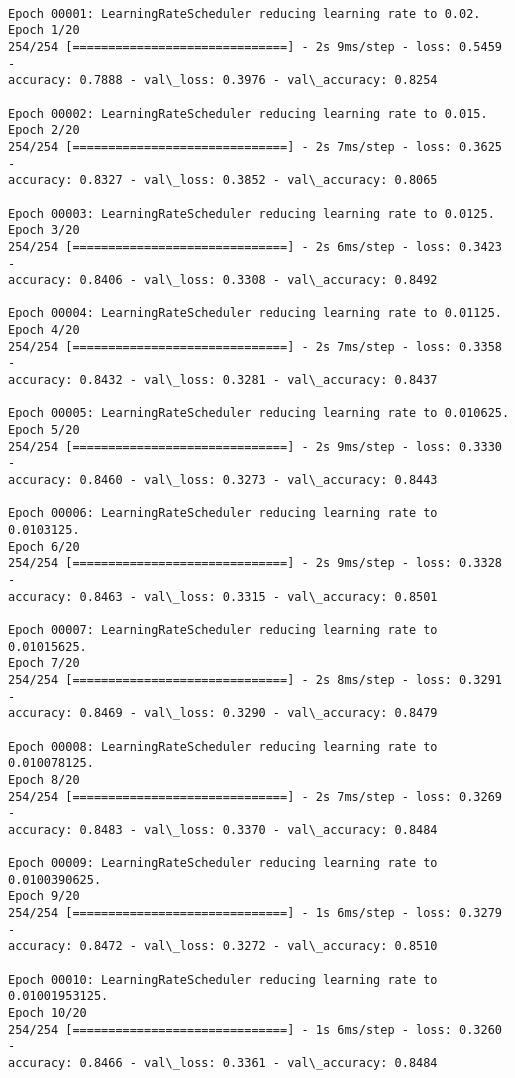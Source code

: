 \documentclass[11pt]{article}
\begin{document}
    \begin{Verbatim}[commandchars=\\\{\}]

Epoch 00001: LearningRateScheduler reducing learning rate to 0.02.
Epoch 1/20
254/254 [==============================] - 2s 9ms/step - loss: 0.5459 -
accuracy: 0.7888 - val\_loss: 0.3976 - val\_accuracy: 0.8254

Epoch 00002: LearningRateScheduler reducing learning rate to 0.015.
Epoch 2/20
254/254 [==============================] - 2s 7ms/step - loss: 0.3625 -
accuracy: 0.8327 - val\_loss: 0.3852 - val\_accuracy: 0.8065

Epoch 00003: LearningRateScheduler reducing learning rate to 0.0125.
Epoch 3/20
254/254 [==============================] - 2s 6ms/step - loss: 0.3423 -
accuracy: 0.8406 - val\_loss: 0.3308 - val\_accuracy: 0.8492

Epoch 00004: LearningRateScheduler reducing learning rate to 0.01125.
Epoch 4/20
254/254 [==============================] - 2s 7ms/step - loss: 0.3358 -
accuracy: 0.8432 - val\_loss: 0.3281 - val\_accuracy: 0.8437

Epoch 00005: LearningRateScheduler reducing learning rate to 0.010625.
Epoch 5/20
254/254 [==============================] - 2s 9ms/step - loss: 0.3330 -
accuracy: 0.8460 - val\_loss: 0.3273 - val\_accuracy: 0.8443

Epoch 00006: LearningRateScheduler reducing learning rate to 0.0103125.
Epoch 6/20
254/254 [==============================] - 2s 9ms/step - loss: 0.3328 -
accuracy: 0.8463 - val\_loss: 0.3315 - val\_accuracy: 0.8501

Epoch 00007: LearningRateScheduler reducing learning rate to 0.01015625.
Epoch 7/20
254/254 [==============================] - 2s 8ms/step - loss: 0.3291 -
accuracy: 0.8469 - val\_loss: 0.3290 - val\_accuracy: 0.8479

Epoch 00008: LearningRateScheduler reducing learning rate to 0.010078125.
Epoch 8/20
254/254 [==============================] - 2s 7ms/step - loss: 0.3269 -
accuracy: 0.8483 - val\_loss: 0.3370 - val\_accuracy: 0.8484

Epoch 00009: LearningRateScheduler reducing learning rate to 0.0100390625.
Epoch 9/20
254/254 [==============================] - 1s 6ms/step - loss: 0.3279 -
accuracy: 0.8472 - val\_loss: 0.3272 - val\_accuracy: 0.8510

Epoch 00010: LearningRateScheduler reducing learning rate to 0.01001953125.
Epoch 10/20
254/254 [==============================] - 1s 6ms/step - loss: 0.3260 -
accuracy: 0.8466 - val\_loss: 0.3361 - val\_accuracy: 0.8484


\end{Verbatim}
\end{document}
